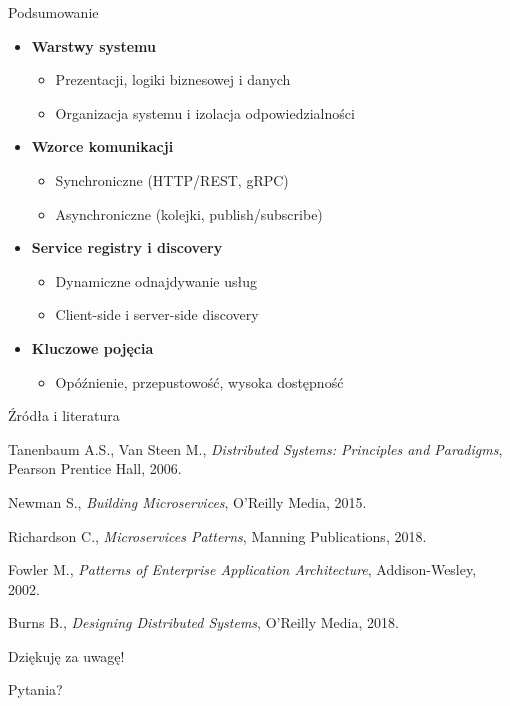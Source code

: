 \documentclass[aspectratio=169]{beamer}
\begin{document}
\begin{frame}{Podsumowanie}
    \begin{itemize}
        \item \textbf{Warstwy systemu}
        \begin{itemize}
            \item Prezentacji, logiki biznesowej i danych
            \item Organizacja systemu i izolacja odpowiedzialności
        \end{itemize}
        \vspace{0.3cm}
        \item \textbf{Wzorce komunikacji}
        \begin{itemize}
            \item Synchroniczne (HTTP/REST, gRPC)
            \item Asynchroniczne (kolejki, publish/subscribe)
        \end{itemize}
        \vspace{0.3cm}
        \item \textbf{Service registry i discovery}
        \begin{itemize}
            \item Dynamiczne odnajdywanie usług
            \item Client-side i server-side discovery
        \end{itemize}
        \vspace{0.3cm}
        \item \textbf{Kluczowe pojęcia}
        \begin{itemize}
            \item Opóźnienie, przepustowość, wysoka dostępność
        \end{itemize}
    \end{itemize}
\end{frame}

\begin{frame}{Źródła i literatura}
    \begin{thebibliography}{9}
         Tanenbaum A.S., Van Steen M., \emph{Distributed Systems: Principles and Paradigms}, Pearson Prentice Hall, 2006.
        
         Newman S., \emph{Building Microservices}, O'Reilly Media, 2015.
        
         Richardson C., \emph{Microservices Patterns}, Manning Publications, 2018.
        
         Fowler M., \emph{Patterns of Enterprise Application Architecture}, Addison-Wesley, 2002.
        
         Burns B., \emph{Designing Distributed Systems}, O'Reilly Media, 2018.
    \end{thebibliography}
\end{frame}

\begin{frame}
    \centering
    \Huge Dziękuję za uwagę!
    
    \vspace{1cm}
    
    \Large Pytania?
\end{frame}
\end{document}
